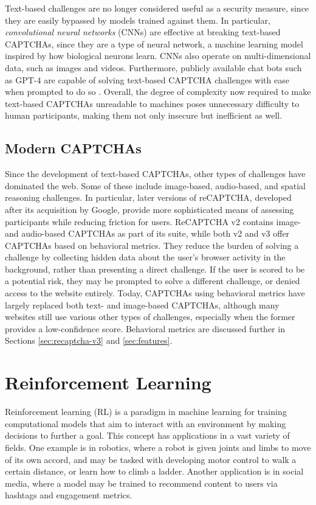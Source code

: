 \documentclass[sigplan,screen,nonacm]{acmart-tagged}
\begin{document}
Text-based challenges are no longer considered useful as a security measure, since they are easily bypassed by models trained against them. In particular, \textit{convolutional neural networks} (CNNs) are effective at breaking text-based CAPTCHAs, since they are a type of neural network, a machine learning model inspired by how biological neurons learn. CNNs also operate on multi-dimensional data, such as images and videos. Furthermore, publicly available chat bots such as GPT-4 are capable of solving text-based CAPTCHA challenges with ease when prompted to do so \cite{malware-bytes}. Overall, the degree of complexity now required to make text-based CAPTCHAs unreadable to machines poses unnecessary difficulty to human participants, making them not only insecure but inefficient as well.

\subsection{Modern CAPTCHAs}
\label{sec:modern-captchas}

Since the development of text-based CAPTCHAs, other types of challenges have dominated the web. Some of these include image-based, audio-based, and spatial reasoning challenges. In particular, later versions of reCAPTCHA, developed after its acquisition by Google, provide more sophisticated means of assessing participants while reducing friction for users. ReCAPTCHA v2 contains image- and audio-based CAPTCHAs as part of its suite, while both v2 and v3 offer CAPTCHAs based on behavioral metrics. They reduce the burden of solving a challenge by collecting hidden data about the user's browser activity in the background, rather than presenting a direct challenge. If the user is scored to be a potential risk, they may be prompted to solve a different challenge, or denied access to the website entirely. Today, CAPTCHAs using behavioral metrics have largely replaced both text- and image-based CAPTCHAs, although many websites still use various other types of challenges, especially when the former provides a low-confidence score. Behavioral metrics are discussed further in Sections \ref{sec:recaptcha-v3} and \ref{sec:features}.

\section{Reinforcement Learning}
\label{sec:reinforcement-learning}

Reinforcement learning (RL) is a paradigm in machine learning for training computational models that aim to interact with an environment by making decisions to further a goal. This concept has applications in a vast variety of fields. One example is in robotics, where a robot is given joints and limbs to move of its own accord, and may be tasked with developing motor control to walk a certain distance, or learn how to climb a ladder. Another application is in social media, where a model may be trained to recommend content to users via hashtags and engagement metrics.
\end{document}
